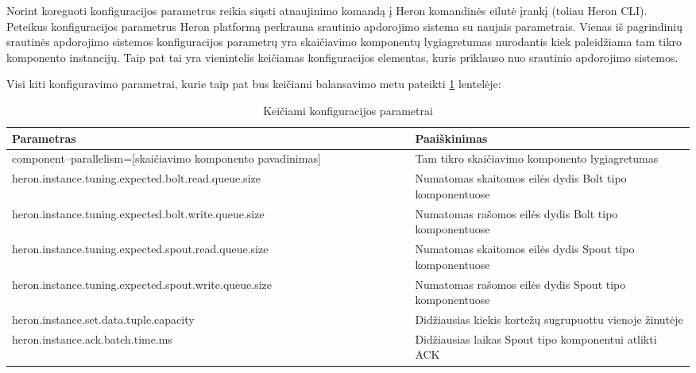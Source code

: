 \documentclass{VUMIFPSbakalaurinis}
\begin{document}
Norint koreguoti konfiguracijos parametrus reikia siųsti atnaujinimo komandą į Heron komandinės eilutė įrankį (toliau Heron CLI). Peteikus konfiguracijos parametrus Heron platformą perkrauna srautinio apdorojimo sistema su naujais parametrais. 
Vienas iš pagrindinių srautinės apdorojimo sistemos konfiguracijos parametrų yra skaičiavimo komponentų lygiagretumas nurodantis kiek paleidžiama tam tikro komponento instancijų. Taip pat tai yra vienintelis keičiamas konfiguracijos elementas, kuris priklauso nuo srautinio apdorojimo sistemos.


Visi kiti konfiguravimo parametrai, kurie taip pat bus keičiami balansavimo metu pateikti \ref{param–table} lentelėje:

\begin{longtable}{|p{0.59\linewidth}|p{0.41\linewidth}|}
    \caption{Keičiami konfiguracijos parametrai}
    \label{param–table}\\
    \hline
    \rowcolor[HTML]{C0C0C0} 
    Parametras                                              & Paaiškinimas                                                                                 \\ \hline
    \endfirsthead
    \endhead
    component–parallelism=[skaičiavimo komponento pavadinimas]            & Tam tikro skaičiavimo komponento lygiagretumas                                 \\ \hline
    heron.instance.tuning.expected.bolt.read.queue.size                   & Numatomas skaitomos eilės dydis Bolt tipo komponentuose                        \\ \hline
    heron.instance.tuning.expected.bolt.write.queue.size                  & Numatomas rašomos eilės dydis Bolt tipo komponentuose                          \\ \hline
    heron.instance.tuning.expected.spout.read.queue.size                  & Numatomas skaitomos eilės dydis Spout tipo komponentuose                       \\ \hline
    heron.instance.tuning.expected.spout.write.queue.size                 & Numatomas rašomos eilės dydis Spout tipo komponentuose                         \\ \hline
    heron.instance.set.data.tuple.capacity                                & Didžiausias kiekis kortežų sugrupuottu vienoje žinutėje                        \\ \hline
    heron.instance.ack.batch.time.ms                                      & Didžiausias laikas Spout tipo komponentui atlikti ACK                          \\ \hline

\end{longtable}
\end{document}
